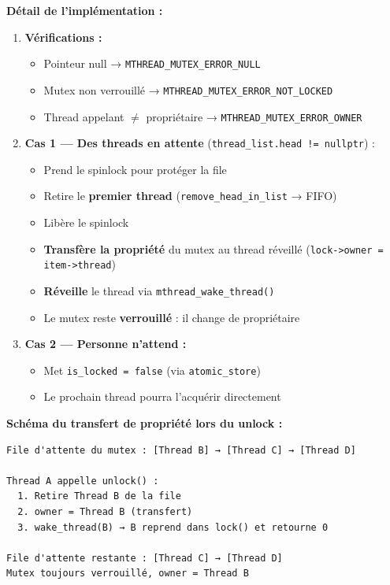 \documentclass[11pt,a4paper]{article}
\let\oldtexttt\texttt
\renewcommand{\texttt}[1]{\oldtexttt{\color{keyword}#1}}
\begin{document}
\textbf{Détail de l'implémentation :}
\begin{enumerate}
  \item \textbf{Vérifications :}
  \begin{itemize}
    \item Pointeur null → \texttt{MTHREAD\_MUTEX\_ERROR\_NULL}
    \item Mutex non verrouillé → \texttt{MTHREAD\_MUTEX\_ERROR\_NOT\_LOCKED}
    \item Thread appelant \(\neq\) propriétaire → \texttt{MTHREAD\_MUTEX\_ERROR\_OWNER}
  \end{itemize}

  \item \textbf{Cas 1 — Des threads en attente} (\texttt{thread\_list.head != nullptr}) :
  \begin{itemize}
    \item Prend le spinlock pour protéger la file
    \item Retire le \textbf{premier thread} (\texttt{remove\_head\_in\_list} → FIFO)
    \item Libère le spinlock
    \item \textbf{Transfère la propriété} du mutex au thread réveillé (\texttt{lock->owner = item->thread})
    \item \textbf{Réveille} le thread via \texttt{mthread\_wake\_thread()}
    \item Le mutex reste \textbf{verrouillé} : il change de propriétaire
  \end{itemize}

  \item \textbf{Cas 2 — Personne n'attend :}
  \begin{itemize}
    \item Met \texttt{is\_locked = false} (via \texttt{atomic\_store})
    \item Le prochain thread pourra l'acquérir directement
  \end{itemize}
\end{enumerate}

\textbf{Schéma du transfert de propriété lors du unlock :}
\begin{lstlisting}[language=text]
File d'attente du mutex : [Thread B] → [Thread C] → [Thread D]

Thread A appelle unlock() :
  1. Retire Thread B de la file
  2. owner = Thread B (transfert)
  3. wake_thread(B) → B reprend dans lock() et retourne 0

File d'attente restante : [Thread C] → [Thread D]
Mutex toujours verrouillé, owner = Thread B
\end{lstlisting}
\end{document}
